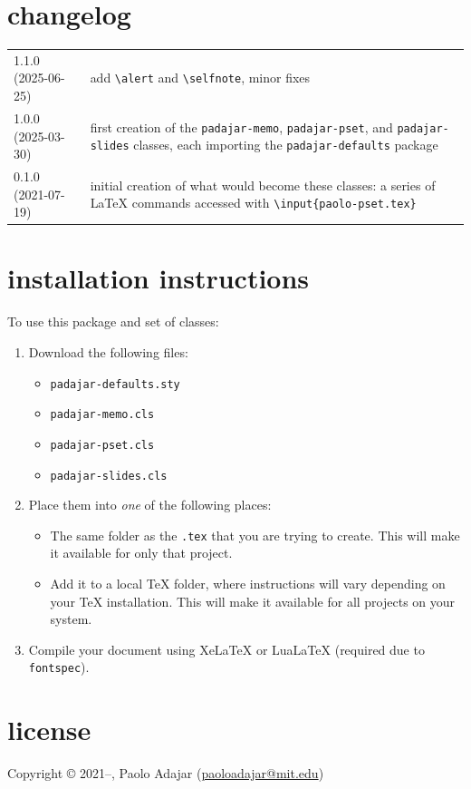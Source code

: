 \documentclass[11pt]{padajar-memo}
\newcommand{\ttslash}[1]{\texttt{\textbackslash #1}}
\begin{document}
\section{changelog}


\begin{tabular}{T p{\textwidth-1.75in}}
	1.1.0 (2025-06-25) &  add \ttslash{alert} and \ttslash{selfnote}, minor fixes\\
	1.0.0 (2025-03-30) & first creation of the \texttt{padajar-memo}, \texttt{padajar-pset}, and \texttt{padajar-slides} classes, each importing the \texttt{padajar-defaults} package  \\
	0.1.0 (2021-07-19) & initial creation of what would become these classes: a series of \LaTeX{} commands accessed with \ttslash{input\{paolo-pset.tex\}}
\end{tabular}


\section{installation instructions}

To use this package and set of classes:

\begin{enumerate}
	\item Download the following files:
	\begin{itemize}
		\item \texttt{padajar-defaults.sty}
		\item \texttt{padajar-memo.cls}
		\item \texttt{padajar-pset.cls}
		\item \texttt{padajar-slides.cls}
	\end{itemize}
	\item Place them into \textit{one} of the following places:
	\begin{itemize}
		\item The same folder as the \texttt{.tex} that you are trying to create. This will make it available for only that project.
		\item Add it to a local \TeX{} folder, where instructions will vary depending on your \TeX{} installation. This will make it available for all projects on your system.
	\end{itemize}
	\item Compile your document using XeLaTeX or LuaLaTeX (required due to \texttt{fontspec}).
\end{enumerate}

\section{license\label{license}}
Copyright \copyright{} 2021--\the\year{}, Paolo Adajar (\href{mailto:paoloadajar@mit.edu}{paoloadajar@mit.edu})
\end{document}
